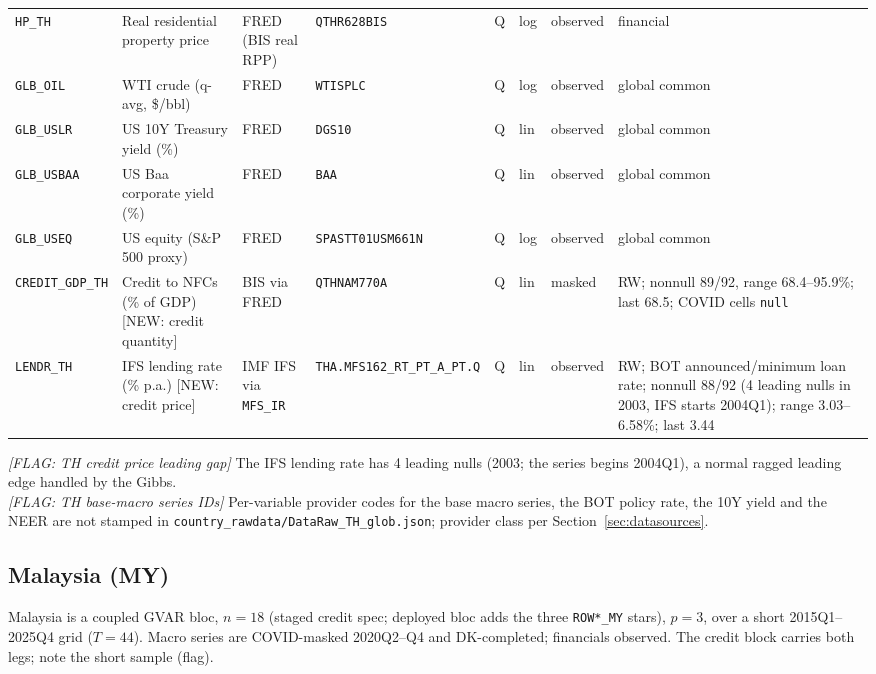 {\begin{longtable}{p{2.3cm}p{3.3cm}p{2.1cm}p{2.2cm}p{0.6cm}p{1.4cm}p{1.9cm}p{2.4cm}}
\texttt{HP\_TH}     & Real residential property price    & FRED (BIS real RPP) & \texttt{QTHR628BIS} & Q & log & observed & financial \\
\texttt{GLB\_OIL}   & WTI crude (q-avg, \$/bbl)          & FRED & \texttt{WTISPLC} & Q & log & observed & global common \\
\texttt{GLB\_USLR}  & US 10Y Treasury yield (\%)         & FRED & \texttt{DGS10} & Q & lin & observed & global common \\
\texttt{GLB\_USBAA} & US Baa corporate yield (\%)        & FRED & \texttt{BAA} & Q & lin & observed & global common \\
\texttt{GLB\_USEQ}  & US equity (S\&P 500 proxy)         & FRED & \texttt{SPASTT01USM661N} & Q & log & observed & global common \\
\texttt{CREDIT\_GDP\_TH} & Credit to NFCs (\% of GDP) [NEW: credit quantity] & BIS via FRED & \texttt{QTHNAM770A} & Q & lin & masked & RW; nonnull 89/92, range 68.4--95.9\%; last 68.5; COVID cells \texttt{null} \\
\texttt{LENDR\_TH}  & IFS lending rate (\% p.a.) [NEW: credit price] & IMF IFS via \texttt{MFS\_IR} & \texttt{THA.\allowbreak MFS162\_RT\_PT\_A\_PT.\allowbreak Q} & Q & lin & observed & RW; BOT announced/minimum loan rate; nonnull 88/92 (4 leading nulls in 2003, IFS starts 2004Q1); range 3.03--6.58\%; last 3.44 \\
\end{longtable}}

\noindent\textit{[FLAG: TH credit price leading gap]} The IFS lending rate has 4
leading nulls (2003; the series begins 2004Q1), a normal ragged leading edge
handled by the Gibbs.\\
\textit{[FLAG: TH base-macro series IDs]} Per-variable provider codes for the
base macro series, the BOT policy rate, the 10Y yield and the NEER are not
stamped in \texttt{country\_rawdata/DataRaw\_TH\_glob.json}; provider class per
Section~\ref{sec:datasources}.

\subsection{Malaysia (MY)}\label{sec:data:MY}

Malaysia is a coupled GVAR bloc, $n=18$ (staged credit spec; deployed bloc adds
the three \texttt{ROW*\_MY} stars), $p=3$, over a short 2015Q1--2025Q4 grid
($T=44$). Macro series are COVID-masked 2020Q2--Q4 and DK-completed; financials
observed. The credit block carries both legs; note the short sample (flag).

